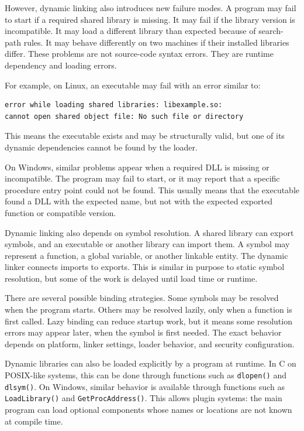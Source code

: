 However, dynamic linking also introduces new failure modes. A program may fail to start if a required shared library is missing. It may fail if the library version is incompatible. It may load a different library than expected because of search-path rules. It may behave differently on two machines if their installed libraries differ. These problems are not source-code syntax errors. They are runtime dependency and loading errors.

For example, on Linux, an executable may fail with an error similar to:

\begin{verbatim}
error while loading shared libraries: libexample.so:
cannot open shared object file: No such file or directory
\end{verbatim}

This means the executable exists and may be structurally valid, but one of its dynamic dependencies cannot be found by the loader.

On Windows, similar problems appear when a required DLL is missing or incompatible. The program may fail to start, or it may report that a specific procedure entry point could not be found. This usually means that the executable found a DLL with the expected name, but not with the expected exported function or compatible version.

Dynamic linking also depends on symbol resolution. A shared library can export symbols, and an executable or another library can import them. A symbol may represent a function, a global variable, or another linkable entity. The dynamic linker connects imports to exports. This is similar in purpose to static symbol resolution, but some of the work is delayed until load time or runtime.

There are several possible binding strategies. Some symbols may be resolved when the program starts. Others may be resolved lazily, only when a function is first called. Lazy binding can reduce startup work, but it means some resolution errors may appear later, when the symbol is first needed. The exact behavior depends on platform, linker settings, loader behavior, and security configuration.

Dynamic libraries can also be loaded explicitly by a program at runtime. In C on POSIX-like systems, this can be done through functions such as \texttt{dlopen()} and \texttt{dlsym()}. On Windows, similar behavior is available through functions such as \texttt{LoadLibrary()} and \texttt{GetProcAddress()}. This allows plugin systems: the main program can load optional components whose names or locations are not known at compile time.

